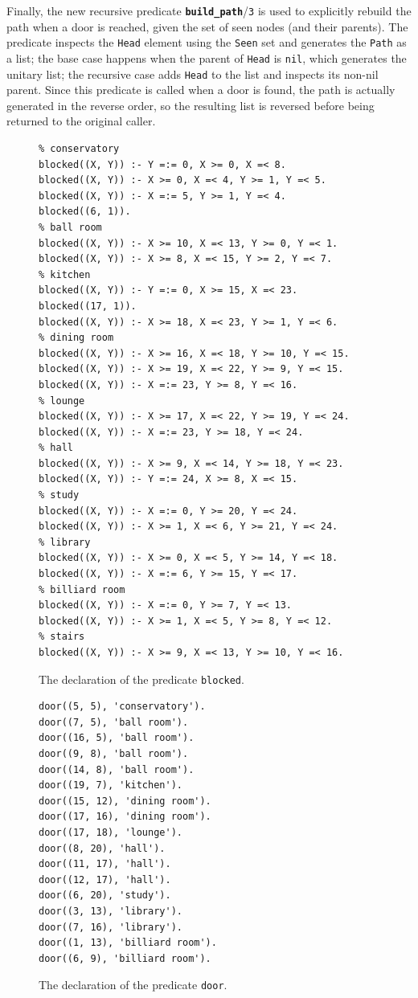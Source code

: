 \documentclass[12pt,a4paper]{article}
\newcommand{\varname}[1]{\texttt{#1}}
\newcommand{\varnamebf}[1]{\textbf{\texttt{#1}}}
\newcommand{\predprot}[2]{{\color{MidnightBlue}\varnamebf{#1}}/{\color{Mulberry}\varname{#2}}}
\newcommand{\predname}[1]{{\color{MidnightBlue}\varname{#1}}}
\begin{document}
Finally, the new recursive predicate \predprot{build\_path}{3} is used to explicitly rebuild the path when a door is reached, given the set of seen nodes (and their parents). The predicate inspects the \varname{Head} element using the \varname{Seen} set and generates the \varname{Path} as a list; the base case happens when the parent of \varname{Head} is \varname{nil}, which generates the unitary list; the recursive case adds \varname{Head} to the list and inspects its non-nil parent. Since this predicate is called when a door is found, the path is actually generated in the reverse order, so the resulting list is reversed before being returned to the original caller.


\begin{figure}[H]
	\centering
\begin{lstlisting}[style=Prolog-pygsty]
%% blocked((X, Y)) - point <X, Y> is inside a room or is a wall
% conservatory
blocked((X, Y)) :- Y =:= 0, X >= 0, X =< 8.
blocked((X, Y)) :- X >= 0, X =< 4, Y >= 1, Y =< 5.
blocked((X, Y)) :- X =:= 5, Y >= 1, Y =< 4.
blocked((6, 1)).
% ball room
blocked((X, Y)) :- X >= 10, X =< 13, Y >= 0, Y =< 1.
blocked((X, Y)) :- X >= 8, X =< 15, Y >= 2, Y =< 7.
% kitchen
blocked((X, Y)) :- Y =:= 0, X >= 15, X =< 23.
blocked((17, 1)).
blocked((X, Y)) :- X >= 18, X =< 23, Y >= 1, Y =< 6.
% dining room
blocked((X, Y)) :- X >= 16, X =< 18, Y >= 10, Y =< 15.
blocked((X, Y)) :- X >= 19, X =< 22, Y >= 9, Y =< 15.
blocked((X, Y)) :- X =:= 23, Y >= 8, Y =< 16.
% lounge
blocked((X, Y)) :- X >= 17, X =< 22, Y >= 19, Y =< 24.
blocked((X, Y)) :- X =:= 23, Y >= 18, Y =< 24.
% hall
blocked((X, Y)) :- X >= 9, X =< 14, Y >= 18, Y =< 23.
blocked((X, Y)) :- Y =:= 24, X >= 8, X =< 15.
% study
blocked((X, Y)) :- X =:= 0, Y >= 20, Y =< 24.
blocked((X, Y)) :- X >= 1, X =< 6, Y >= 21, Y =< 24.
% library
blocked((X, Y)) :- X >= 0, X =< 5, Y >= 14, Y =< 18.
blocked((X, Y)) :- X =:= 6, Y >= 15, Y =< 17.
% billiard room
blocked((X, Y)) :- X =:= 0, Y >= 7, Y =< 13.
blocked((X, Y)) :- X >= 1, X =< 5, Y >= 8, Y =< 12.
% stairs
blocked((X, Y)) :- X >= 9, X =< 13, Y >= 10, Y =< 16.
\end{lstlisting}
	\caption{The declaration of the predicate \predname{blocked}.} 
	\label{fig:blocked}
\end{figure}

\begin{figure}[H]
	\centering
\begin{lstlisting}[style=Prolog-pygsty]
%% door((X, Y), R) - there's a door to room R from point <X, Y>
door((5, 5), 'conservatory').
door((7, 5), 'ball room').
door((16, 5), 'ball room').
door((9, 8), 'ball room').
door((14, 8), 'ball room').
door((19, 7), 'kitchen').
door((15, 12), 'dining room').
door((17, 16), 'dining room').
door((17, 18), 'lounge').
door((8, 20), 'hall').
door((11, 17), 'hall').
door((12, 17), 'hall').
door((6, 20), 'study').
door((3, 13), 'library').
door((7, 16), 'library').
door((1, 13), 'billiard room').
door((6, 9), 'billiard room').
\end{lstlisting}
	\caption{The declaration of the predicate \predname{door}.} 
	\label{fig:door}
\end{figure}
\end{document}
